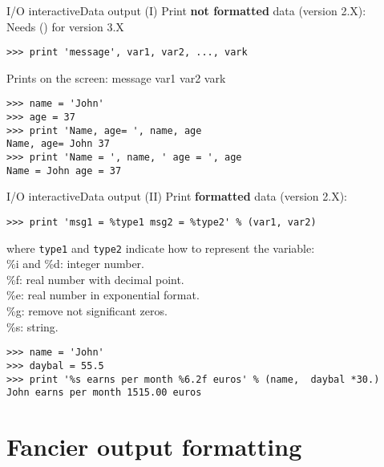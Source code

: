 \documentclass[10pt,compress]{beamer} %
\begin{document}
\begin{frame}[fragile]{I/O interactive}{Data output (I)}
Print \textbf{not formatted} data (version 2.X):\\
Needs () for version 3.X
\begin{verbatim}
>>> print 'message', var1, var2, ..., vark
\end{verbatim}
Prints on the screen: \alert{message var1 var2 vark}
\begin{verbatim}
>>> name = 'John'
>>> age = 37
>>> print 'Name, age= ', name, age
Name, age= John 37
>>> print 'Name = ', name, ' age = ', age
Name = John age = 37
\end{verbatim}
\end{frame}

\begin{frame}[fragile]{I/O interactive}{Data output (II)}
Print \textbf{formatted} data (version 2.X):
\begin{verbatim}
>>> print 'msg1 = %type1 msg2 = %type2' % (var1, var2)
\end{verbatim}
where \texttt{type1} and   \texttt{type2} indicate how to represent the variable:\\	
\hspace{0.5cm}\%i and \%d: integer number.\\
\hspace{0.5cm}\%f: real number with decimal point.\\
\hspace{0.5cm}\%e: real number in exponential format.\\
\hspace{0.5cm}\%g: remove not significant zeros.\\
\hspace{0.5cm}\%s: string.\\
\footnotesize{\begin{verbatim}
>>> name = 'John'
>>> daybal = 55.5
>>> print '%s earns per month %6.2f euros' % (name,  daybal *30.)
John earns per month 1515.00 euros
\end{verbatim}
}
\end{frame}



\section{Fancier output formatting}
\end{document}
